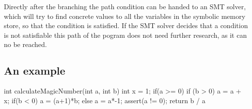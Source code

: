 Directly after the branching the path condition can be handed to an SMT solver, which will try to find concrete values to all the variables in the symbolic memory store, so that the condition is satisfied. If the SMT solver decides that a condition is not satisfiable this path of the pogram does not need further research, as it can no be reached.
\subsection{An example}
\begin{codesnippet}[caption={Simple Symbolic Execution Example}, label={codeSnippet:symbolicExecution}]
int calculateMagicNumber(int a, int b){
   int x = 1;
   if(a >= 0){
      if (b > 0){
         a = a + x;
      }
      if(b < 0){
        a = (a+1)*b;
      }
   }else{
     a = a*-1;
   }
  assert(a != 0);
  return b / a
}
\end{codesnippet}
